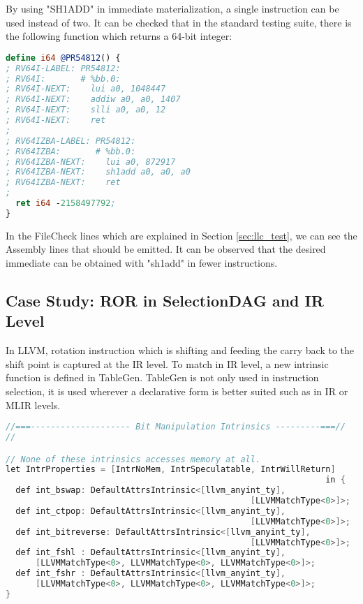 By using "SH1ADD" in immediate materialization, a single instruction can be used instead of two. It can be checked that in the standard testing suite, there is the following function which returns a 64-bit integer:
\begin{minipage}{\linewidth}
\begin{lstlisting}[language=llvm,style=nasm, caption={Function for Immediate Materialization}]
define i64 @PR54812() {
; RV64I-LABEL: PR54812:
; RV64I:       # %bb.0:
; RV64I-NEXT:    lui a0, 1048447
; RV64I-NEXT:    addiw a0, a0, 1407
; RV64I-NEXT:    slli a0, a0, 12
; RV64I-NEXT:    ret
;
; RV64IZBA-LABEL: PR54812:
; RV64IZBA:       # %bb.0:
; RV64IZBA-NEXT:    lui a0, 872917
; RV64IZBA-NEXT:    sh1add a0, a0, a0
; RV64IZBA-NEXT:    ret
;
  ret i64 -2158497792;
}
\end{lstlisting}
\end{minipage}
In the FileCheck lines which are explained in Section \ref{sec:llc_test}, we can see the Assembly lines that should be emitted. It can be observed that the desired immediate can be obtained with "sh1add" in fewer instructions.

\subsection{Case Study: ROR in SelectionDAG and IR Level}

In LLVM, rotation instruction which is shifting and feeding the carry back to the shift point is captured at the IR level. To match in IR level, a new intrinsic function is defined in TableGen. TableGen is not only used in instruction selection, it is used wherever a declarative form is better suited such as in IR or MLIR levels.

\begin{lstlisting}[language=C++, caption={Funnel Shift Intrinsic Definition}]
//===-------------------- Bit Manipulation Intrinsics ---------===//
//

// None of these intrinsics accesses memory at all.
let IntrProperties = [IntrNoMem, IntrSpeculatable, IntrWillReturn]
                                                                in {
  def int_bswap: DefaultAttrsIntrinsic<[llvm_anyint_ty],
                                                 [LLVMMatchType<0>]>;
  def int_ctpop: DefaultAttrsIntrinsic<[llvm_anyint_ty],
                                                 [LLVMMatchType<0>]>;
  def int_bitreverse: DefaultAttrsIntrinsic<[llvm_anyint_ty],
                                                 [LLVMMatchType<0>]>;
  def int_fshl : DefaultAttrsIntrinsic<[llvm_anyint_ty],
      [LLVMMatchType<0>, LLVMMatchType<0>, LLVMMatchType<0>]>;
  def int_fshr : DefaultAttrsIntrinsic<[llvm_anyint_ty],
      [LLVMMatchType<0>, LLVMMatchType<0>, LLVMMatchType<0>]>;
}
\end{lstlisting}


